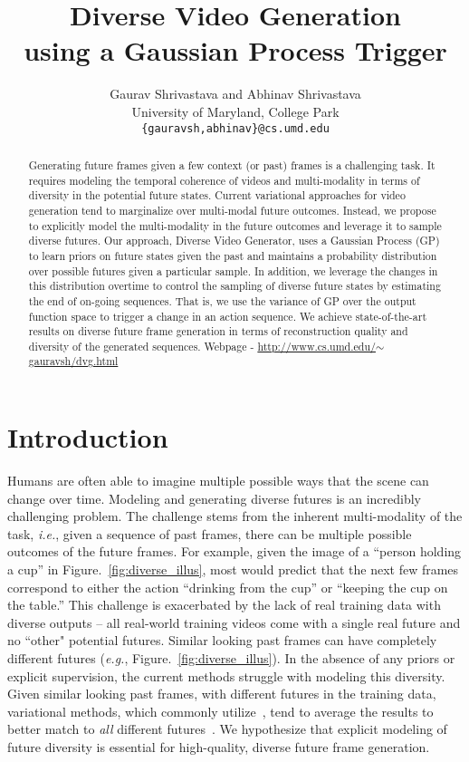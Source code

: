 \documentclass{article} \usepackage{iclr2021_conference,times}
\title{Diverse Video Generation\\
using a Gaussian Process Trigger}
\author{Gaurav Shrivastava and Abhinav Shrivastava \\
University of Maryland, College Park\\
\texttt{\{gauravsh,abhinav\}@cs.umd.edu} \\
}
\def\eg{\emph{e.g.}}
\def\ie{\emph{i.e.}}
\begin{document}
\maketitle

\begin{abstract}
Generating future frames given a few context (or past) frames is a challenging task. It requires modeling the temporal coherence of videos and multi-modality in terms of diversity in the potential future states. Current variational approaches for video generation tend to marginalize over multi-modal future outcomes. Instead, we propose to explicitly model the multi-modality in the future outcomes and leverage it to sample diverse futures. Our approach, Diverse Video Generator, uses a Gaussian Process (GP) to learn priors on future states given the past and maintains a probability distribution over possible futures given a particular sample. In addition, we leverage the changes in this distribution overtime to control the sampling of diverse future states by estimating the end of on-going sequences. That is, we use the variance of GP over the output function space to trigger a change in an action sequence. We achieve state-of-the-art results on diverse future frame generation in terms of reconstruction quality and diversity of the generated sequences. Webpage - \href{http://www.cs.umd.edu/~gauravsh/dvg.html}{http://www.cs.umd.edu/$\sim$gauravsh/dvg.html}
\end{abstract}

\section{Introduction}

Humans are often able to imagine multiple possible ways that the scene can change over time. Modeling and generating diverse futures is an incredibly challenging problem. The challenge stems from the inherent multi-modality of the task, \ie, given a sequence of past frames, there can be multiple possible outcomes of the future frames. For example, given the image of a ``person holding a cup'' in Figure.~\ref{fig:diverse_illus}, most would predict that the next few frames correspond to either the action ``drinking from the cup'' or ``keeping the cup on the table.'' This challenge is exacerbated by the lack of real training data with diverse outputs -- all real-world training videos come with a single real future and no ``other" potential futures. Similar looking past frames can have completely different futures (\eg, Figure.~\ref{fig:diverse_illus}). In the absence of any priors or explicit supervision, the current methods struggle with modeling this diversity. Given similar looking past frames, with different futures in the training data, variational methods, which commonly utilize~\citep{Kingma2013AutoEncodingVB}, tend to average the results to better match to \emph{all} different futures~\citep{denton2018stochastic,babaeizadeh2017stochastic,Gao2018DisentanglingPA,lee2018savp,Oliu:2017}. We hypothesize that explicit modeling of future diversity is essential for high-quality, diverse future frame generation.
\end{document}
